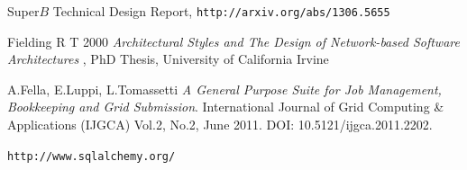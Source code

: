 \documentclass[a4paper]{jpconf}
\begin{document}
\begin{thebibliography}{30}


Super$B$ Technical Design Report, \verb"http://arxiv.org/abs/1306.5655"

Fielding R T 2000 {\it Architectural Styles and The Design of Network-based
Software Architectures }, PhD Thesis, University of California Irvine

A.Fella, E.Luppi, L.Tomassetti \emph{A General Purpose Suite for Job Management, Bookkeeping and Grid Submission}. International Journal of Grid Computing \& Applications (IJGCA) Vol.2, No.2, June 2011. DOI: 10.5121/ijgca.2011.2202.

\verb"http://www.sqlalchemy.org/"

\end{thebibliography}
\end{document}
